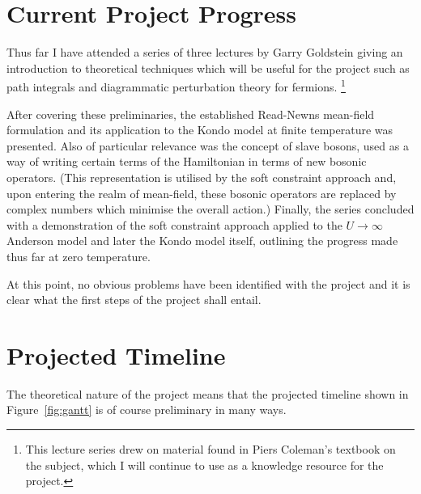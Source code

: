 \documentclass[12pt]{article}
\begin{document}
\section{Current Project Progress}

Thus far I have attended a series of three lectures by Garry Goldstein giving an introduction to theoretical techniques which will be useful for the project such as path integrals and diagrammatic perturbation theory for fermions. \footnote{This lecture series drew on material found in Piers Coleman's textbook on the subject, which I will continue to use as a knowledge resource for the project.}

After covering these preliminaries, the established Read-Newns \cite{ReadNewns} mean-field formulation and its application to the Kondo model at finite temperature was presented. Also of particular relevance was the concept of slave bosons, used as a way of writing certain terms of the Hamiltonian in terms of new bosonic operators. (This representation is utilised by the soft constraint approach and, upon entering the realm of mean-field, these bosonic operators are replaced by complex numbers which minimise the overall action.) Finally, the series concluded with a demonstration of the soft constraint approach applied to the $ U \rightarrow \infty $ Anderson model and later the Kondo model itself, outlining the progress made thus far at zero temperature.

At this point, no obvious problems have been identified with the project and it is clear what the first steps of the project shall entail.

\section{Projected Timeline}

The theoretical nature of the project means that the projected timeline shown in Figure~\ref{fig:gantt} is of course preliminary in many ways.
\end{document}
